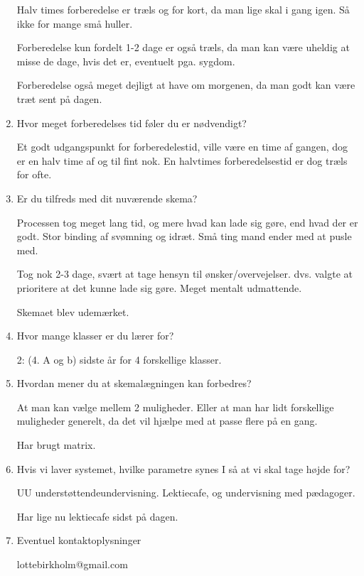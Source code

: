 \begin{enumerate}
    Halv times forberedelse er træls og for kort, da man lige skal i gang igen. Så ikke for mange små huller. 
	
	Forberedelse kun fordelt 1-2 dage er også træls, da man kan være uheldig at misse de dage, hvis det er, eventuelt pga. sygdom.
	
	Forberedelse også meget dejligt at have om morgenen, da man godt kan være træt sent på dagen.
    
    
    \item Hvor meget forberedelses tid føler du er nødvendigt?
	
	Et godt udgangspunkt for forberedelestid, ville være en time af gangen, dog er en halv time af og til fint nok. En halvtimes forberedelsestid er dog træls for ofte.


    \item Er du tilfreds med dit nuværende skema?
	
	Processen tog meget lang tid, og mere hvad kan lade sig gøre, end hvad der er godt. Stor binding af svømning og idræt. Små ting mand ender med at pusle med.
	
	Tog nok 2-3 dage, svært at tage hensyn til ønsker/overvejelser. dvs. valgte at prioritere at det kunne lade sig gøre. Meget mentalt udmattende.
	
	Skemaet blev udemærket.
    
    
    \item Hvor mange klasser er du lærer for?
	
	2: (4. A og b) sidste år for 4 forskellige klasser. 
    
    
    \item Hvordan mener du at skemalægningen kan forbedres?
	
	At man kan vælge mellem 2 muligheder. Eller at man har lidt forskellige muligheder generelt, da det vil hjælpe med at passe flere på en gang. 
	
	Har brugt matrix. 
    
    
    \item Hvis vi laver systemet, hvilke parametre synes I så at vi skal tage højde for?
	
	UU understøttendeundervisning. Lektiecafe, og undervisning med pædagoger.
	
	Har lige nu lektiecafe sidst på dagen.  
    
    
    \item Eventuel kontaktoplysninger
	
	lottebirkholm@gmail.com
\end{enumerate}

